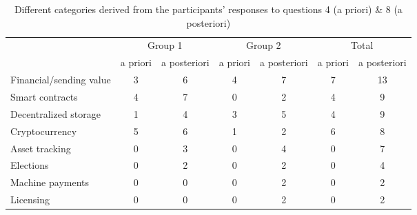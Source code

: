 \begin{table}[]
    \centering
    \begin{tabular}{l|cc|cc|cc}
          & \multicolumn{2}{c}{Group 1} & \multicolumn{2}{c}{Group 2} & \multicolumn{2}{c}{Total} \\
          & a priori   & a posteriori  & a priori   & a posteriori   & a priori  & a posteriori  \\
        \hline
Financial/sending value &   3         &        6       &     4       &      7          &    7       &       13      \\
Smart contracts          &   4         &        7       &     0       &        2        &     4      &       9      \\
Decentralized storage   &     1       &        4       &      3      &         5       &     4      &      9        \\
Cryptocurrency          &   5         &       6        &      1      &       2         &     6      &      8        \\
\hdashline
Asset tracking          &     0       &       3        &     0       &       4         &     0      &       7       \\
Elections               &     0       &       2        &     0       &       2         &     0      &      4        \\
Machine payments        &     0       &       0        &     0       &       2         &     0      &      2        \\
Licensing               &     0       &       0        &     0       &       2         &     0      &       2       \\
\end{tabular}
    \caption{Different categories derived from the participants' responses to questions 4 (a priori) \& 8 (a posteriori)}
    \label{tab:results48}
\end{table}

